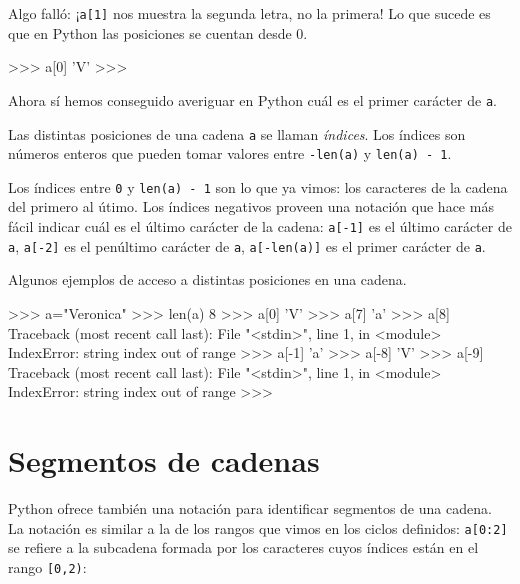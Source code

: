 Algo falló: ¡\lstinline+a[1]+ nos muestra la segunda letra, no la
primera! Lo que sucede es que en Python las posiciones se cuentan
desde 0.

\begin{codigo-python-sn}
>>> a[0]
'V'
>>>
\end{codigo-python-sn}

Ahora sí hemos conseguido averiguar en Python cuál es el primer carácter de
\lstinline!a!.

\begin{atencion}
Las distintas posiciones de una cadena \lstinline!a! se llaman
{\it índices}. Los índices son números enteros que pueden tomar
valores entre \lstinline!-len(a)! y \lstinline!len(a) - 1!.

Los índices entre \lstinline!0! y \lstinline!len(a) - 1! son lo que ya
vimos: los caracteres de la cadena del primero al útimo. Los índices
negativos proveen una notación que hace más fácil indicar cuál es el último
carácter de la cadena: \lstinline!a[-1]! es el último carácter de
\lstinline!a!, \lstinline!a[-2]! es el penúltimo carácter de \lstinline!a!,
\lstinline!a[-len(a)]! es el primer carácter de \lstinline!a!.
\end{atencion}

Algunos ejemplos de acceso a distintas posiciones en una cadena.

\begin{codigo-python-sn}
>>> a="Veronica"
>>> len(a)
8
>>> a[0]
'V'
>>> a[7]
'a'
>>> a[8]
Traceback (most recent call last):
  File "<stdin>", line 1, in <module>
IndexError: string index out of range
>>> a[-1]
'a'
>>> a[-8]
'V'
>>> a[-9]
Traceback (most recent call last):
  File "<stdin>", line 1, in <module>
IndexError: string index out of range
>>>
\end{codigo-python-sn}


\section{Segmentos de cadenas}

Python ofrece también una notación para identificar segmentos de una
cadena. La notación es similar a la de los rangos que vimos en los ciclos
definidos: \lstinline+a[0:2]+ se refiere a la subcadena formada por los
caracteres cuyos índices están en el rango \lstinline+[0,2)+:

